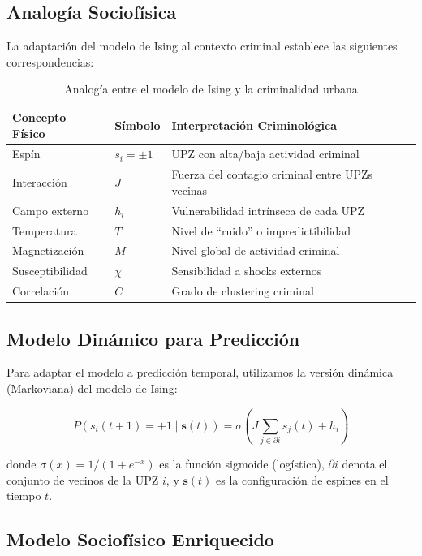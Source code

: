 \documentclass[12pt,a4paper]{article}
\begin{document}
\subsection{Analogía Sociofísica}

La adaptación del modelo de Ising al contexto criminal establece las siguientes correspondencias:

\begin{table}[H]
\centering
\caption{Analogía entre el modelo de Ising y la criminalidad urbana}
\label{tab:analogia}
\begin{tabular}{@{}lll@{}}
\toprule
\textbf{Concepto Físico} & \textbf{Símbolo} & \textbf{Interpretación Criminológica} \\
\midrule
Espín & $s_i = \pm 1$ & UPZ con alta/baja actividad criminal \\
Interacción & $J$ & Fuerza del contagio criminal entre UPZs vecinas \\
Campo externo & $h_i$ & Vulnerabilidad intrínseca de cada UPZ \\
Temperatura & $T$ & Nivel de ``ruido'' o impredictibilidad \\
Magnetización & $M$ & Nivel global de actividad criminal \\
Susceptibilidad & $\chi$ & Sensibilidad a shocks externos \\
Correlación & $C$ & Grado de clustering criminal \\
\bottomrule
\end{tabular}
\end{table}

\subsection{Modelo Dinámico para Predicción}

Para adaptar el modelo a predicción temporal, utilizamos la versión dinámica (Markoviana) del modelo de Ising:

\begin{equation}\label{eq:dinamico}
P\left(s_i(t+1) = +1 \mid \mathbf{s}(t)\right) = \sigma\left(J \sum_{j \in \partial i} s_j(t) + h_i\right)
\end{equation}

donde $\sigma(x) = 1/(1+e^{-x})$ es la función sigmoide (logística), $\partial i$ denota el conjunto de vecinos de la UPZ $i$, y $\mathbf{s}(t)$ es la configuración de espines en el tiempo $t$.

\subsection{Modelo Sociofísico Enriquecido}
\end{document}
